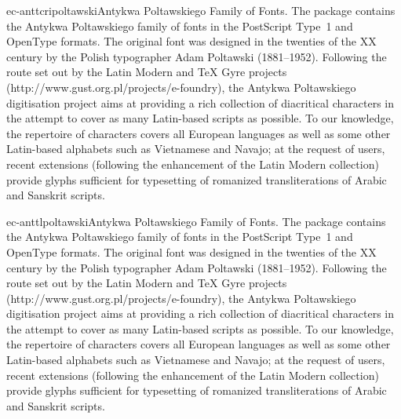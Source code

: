 \documentclass{ddltxtyp}
\begin{document}
\begin{package}{ec-anttcri}{poltawski}{Antykwa Poltawskiego Family of Fonts.}
The package contains the Antykwa Poltawskiego family of fonts
in the PostScript Type~1 and OpenType formats. The original
font was designed in the twenties of the XX century by the
Polish typographer Adam Poltawski (1881--1952). Following the
route set out by the Latin Modern and {\TeX} Gyre projects
(http://www.gust.org.pl/projects/e-foundry), the Antykwa
Poltawskiego digitisation project aims at providing a rich
collection of diacritical characters in the attempt to cover as
many Latin-based scripts as possible. To our knowledge, the
repertoire of characters covers all European languages as well
as some other Latin-based alphabets such as Vietnamese and
Navajo; at the request of users, recent extensions (following
the enhancement of the Latin Modern collection) provide glyphs
sufficient for typesetting of romanized transliterations of
Arabic and Sanskrit scripts. %
\end{package}
\begin{package}{ec-anttl}{poltawski}{Antykwa Poltawskiego Family of Fonts.}
The package contains the Antykwa Poltawskiego family of fonts
in the PostScript Type~1 and OpenType formats. The original
font was designed in the twenties of the XX century by the
Polish typographer Adam Poltawski (1881--1952). Following the
route set out by the Latin Modern and {\TeX} Gyre projects
(http://www.gust.org.pl/projects/e-foundry), the Antykwa
Poltawskiego digitisation project aims at providing a rich
collection of diacritical characters in the attempt to cover as
many Latin-based scripts as possible. To our knowledge, the
repertoire of characters covers all European languages as well
as some other Latin-based alphabets such as Vietnamese and
Navajo; at the request of users, recent extensions (following
the enhancement of the Latin Modern collection) provide glyphs
sufficient for typesetting of romanized transliterations of
Arabic and Sanskrit scripts. %
\end{package}
\end{document}
